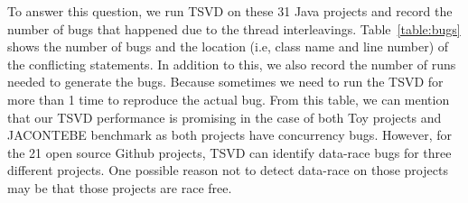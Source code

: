 To answer this question, we run TSVD on these 31 Java projects and record the
number of bugs that happened due to the thread interleavings.  Table~\ref{table:bugs} shows
the number of bugs and the location (i.e, class name and line number) of the conflicting statements. In addition
to this, we also record the number of runs needed to generate the bugs. Because
sometimes we need to run the TSVD for more than 1 time to reproduce the actual bug.
From this table, we can mention that our TSVD performance is promising in the case of both Toy
projects and JACONTEBE benchmark as both projects have concurrency bugs.
However, for the 21 open source Github projects, TSVD can identify data-race
bugs for three different projects. One possible reason not to detect data-race on those projects may be that those projects
are race free.






